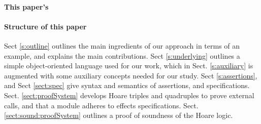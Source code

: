
\paragraph{This paper's } %

 \paragraph{Structure of this paper}
Sect \ref{s:outline}   outlines the main ingredients of our approach in terms of an example, and explains the main contributions.
Sect \ref{s:underlying} outlines a simple object-oriented language used for our work, which in Sect. \ref{s:auxiliary} is augmented with some auxiliary concepts needed for our study.
Sect \ref{s:assertions}, and Sect \ref{sect:spec}  give syntax and semantics of  assertions, and  specifications.
Sect. \ref{sect:proofSystem} develops Hoare triples and quadruples to prove external calls, and that a module adheres to \tamed effects specifications.
Sect. \ref{sect:sound:proofSystem} outlines a proof of soundness of the Hoare logic. 
 
 
 

